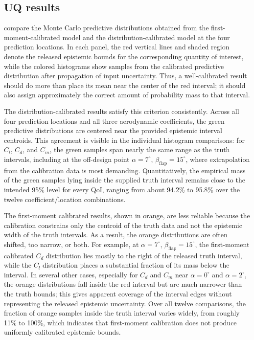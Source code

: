 \documentclass[journal]{new-aiaa}
\begin{document}
\subsection{UQ results}
\label{sec:uq_results}

 compare the Monte Carlo predictive distributions obtained from the first-moment-calibrated model and the distribution-calibrated model at the four prediction locations. In each panel, the red vertical lines and shaded region denote the released epistemic bounds for the corresponding quantity of interest, while the colored histograms show samples from the calibrated predictive distribution after propagation of input uncertainty. Thus, a well-calibrated result should do more than place its mean near the center of the red interval; it should also assign approximately the correct amount of probability mass to that interval.

The distribution-calibrated results satisfy this criterion consistently. Across all four prediction locations and all three aerodynamic coefficients, the green predictive distributions are centered near the provided epistemic interval centroids. This agreement is visible in the individual histogram comparisons: for $C_l$, $C_d$, and $C_m$, the green samples span nearly the same range as the truth intervals, including at the off-design point $\alpha=7^\circ$, $\beta_{\mathrm{flap}}=15^\circ$, where extrapolation from the calibration data is most demanding. Quantitatively, the empirical mass of the green samples lying inside the supplied truth interval remains close to the intended 95\% level for every QoI, ranging from about 94.2\% to 95.8\% over the twelve coefficient/location combinations.

The first-moment calibrated results, shown in orange, are less reliable because the calibration constrains only the centroid of the truth data and not the epistemic width of the truth intervals. As a result, the orange distributions are often shifted, too narrow, or both. For example, at $\alpha=7^\circ$, $\beta_{\mathrm{flap}}=15^\circ$, the first-moment calibrated $C_d$ distribution lies mostly to the right of the released truth interval, while the $C_l$ distribution places a substantial fraction of its mass below the interval. In several other cases, especially for $C_d$ and $C_m$ near $\alpha=0^\circ$ and $\alpha=2^\circ$, the orange distributions fall inside the red interval but are much narrower than the truth bounds; this gives apparent coverage of the interval edges without representing the released epistemic uncertainty. Over all twelve comparisons, the fraction of orange samples inside the truth interval varies widely, from roughly 11\% to 100\%, which indicates that first-moment calibration does not produce uniformly calibrated epistemic bounds.
\end{document}

